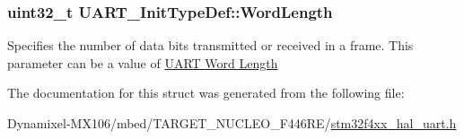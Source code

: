 \subsubsection[{\texorpdfstring{Word\+Length}{WordLength}}]{\setlength{\rightskip}{0pt plus 5cm}uint32\+\_\+t U\+A\+R\+T\+\_\+\+Init\+Type\+Def\+::\+Word\+Length}\hypertarget{struct_u_a_r_t___init_type_def_a0f1cd85e62aa4fd4b36ee9e610e7789f}{}\label{struct_u_a_r_t___init_type_def_a0f1cd85e62aa4fd4b36ee9e610e7789f}
Specifies the number of data bits transmitted or received in a frame. This parameter can be a value of \hyperlink{group___u_a_r_t___word___length}{U\+A\+RT Word Length} 

The documentation for this struct was generated from the following file\+:\begin{DoxyCompactItemize}
\item 
Dynamixel-\/\+M\+X106/mbed/\+T\+A\+R\+G\+E\+T\+\_\+\+N\+U\+C\+L\+E\+O\+\_\+\+F446\+R\+E/\hyperlink{stm32f4xx__hal__uart_8h}{stm32f4xx\+\_\+hal\+\_\+uart.\+h}\end{DoxyCompactItemize}
